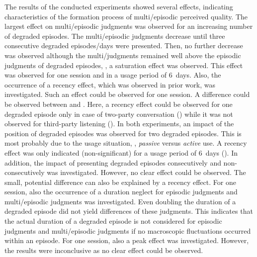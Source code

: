 The results of the conducted experiments showed several effects, indicating characteristics of the formation process of multi\-/episodic perceived quality.
The largest effect on multi\-/episodic judgments was observed for an increasing number of degraded episodes.
The multi\-/episodic judgments decrease until three consecutive degraded episodes/days were presented.
Then, no further decrease was observed although the multi\-/judgments remained well above the episodic judgments of degraded episodes, \ie, a saturation effect was observed.
This effect was observed for one session and in a usage period of 6~days.
Also, the occurrence of a recency effect, which was observed in prior work, was investigated.
Such an effect could be observed for one session.
A difference could be observed between  and \EIIa{}.
Here, a recency effect could be observed for one degraded episode only in case of two-party conversation () while it was not observed for third-party listening (\EIIa{}).
In both experiments, an impact of the position of degraded episodes was observed for two degraded episodes.
This is most probably due to the usage situation, \ie, \emph{passive} versus \emph{active} use.
A recency effect was only indicated (non-significant) for a usage period of 6~days  ().
In addition, the impact of presenting degraded episodes consecutively and non-consecutively was investigated.
However, no clear effect could be observed.
The small, potential difference can also be explained by a recency effect.
For one session, also the occurrence of a duration neglect for episodic judgments and multi\-/episodic judgments was investigated.
Even doubling the duration of a degraded episode did not yield differences of these judgments.
This indicates that the actual duration of a degraded episode is not considered for episodic judgments and multi\-/episodic judgments if no macroscopic fluctuations occurred within an episode.
For one session, also a peak effect was investigated.
However, the results were inconclusive as no clear effect could be observed.

